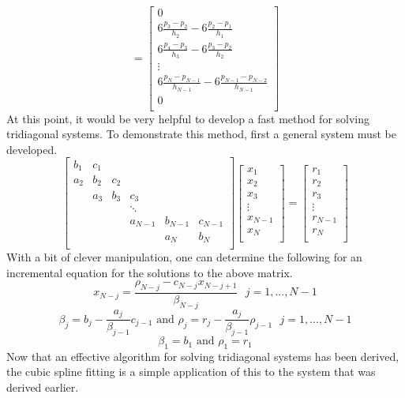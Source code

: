 \documentclass[12pt]{article}
\begin{document}
\[ =
\begin{bmatrix}
0 \\
6\frac{p_3-p_2}{h_2} - 6\frac{p_2-p_1}{h_1}\\
6\frac{p_4-p_3}{h_3} - 6\frac{p_3-p_2}{h_2}\\
\vdots \\
6\frac{p_N-p_{N-1}}{h_{N-1}} - 6\frac{p_{N-1}-p_{N-2}}{h_{N-1}}\\
0 \\
\end{bmatrix} \]
At this point, it would be very helpful to develop a fast method for solving tridiagonal systems.  To demonstrate this method, first a general system must be developed.
\[
\begin{bmatrix}
b_1 & c_1 & & & & \\
a_2 & b_2 & c_2 & & & \\
 & a_3 & b_3 & c_3 & & \\
 & & & \ddots & & \\
 & & & a_{N-1} & b_{N-1}& c_{N-1} \\
 & & & & a_N & b_N \\  
\end{bmatrix}
\begin{bmatrix}
x_1\\
x_2\\
x_3\\
\vdots \\
x_{N-1} \\
x_N \\ 
\end{bmatrix}
=
\begin{bmatrix}
r_1\\
r_2\\
r_3\\
\vdots \\
r_{N-1} \\
r_N \\ 
\end{bmatrix}
 \]
With a bit of clever manipulation, one can determine the following for an incremental equation for the solutions to the above matrix.
\begin{equation}
\label{Tridiag}
x_{N-j} = \frac{\rho_{N-j}-c_{N-j}x_{N-j+1}}{\beta_{N-j}} \text{     } j=1,...,N-1
\end{equation}
\begin{equation}
\label{TridiagCoeff}
\beta_j = b_j - \frac{a_j}{\beta_{j-1}}c_{j-1}  \text{ and } \rho_j = r_j-\frac{a_j}{\beta_{j-1}}\rho_{j-1} \text{    }j=1,...,N-1
\end{equation}
\begin{equation}
\label{TridiagInitCoeff}
\beta_1 = b_1 \text{ and } \rho_1 = r_1
\end{equation}
Now that an effective algorithm for solving tridiagonal systems has been derived, the cubic spline fitting is a simple application of this to the system that was derived earlier.
\end{document}
